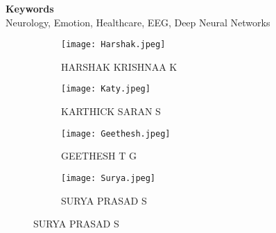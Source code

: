 \documentclass[12 points, a4paper]{article} %
\def\keywords#1{\begin{center}{\bf Keywords}\\{#1}\end{center}} %
\begin{document}
\vspace{5mm} %

\keywords{Neurology, Emotion, Healthcare, EEG, Deep Neural Networks} %

\vspace{15mm} %


\begin{figure}[htbp]
\centering
  \begin{subfigure}[b]{0.24\linewidth}
    \texttt{[image: Harshak.jpeg]}
     \captionsetup{labelformat=empty}
     \caption{HARSHAK KRISHNAA K}
  \end{subfigure}
  \begin{subfigure}[b]{0.22\linewidth}
    \texttt{[image: Katy.jpeg]}
    \captionsetup{labelformat=empty}
    \caption{KARTHICK SARAN S}
  \end{subfigure}
  \begin{subfigure}[b]{0.22\linewidth}
    \texttt{[image: Geethesh.jpeg]}
    \captionsetup{labelformat=empty}
    \caption{GEETHESH T G}
  \end{subfigure}
  \begin{subfigure}[b]{0.22\linewidth}
    \texttt{[image: Surya.jpeg]}
     \captionsetup{labelformat=empty}
     \caption{SURYA PRASAD S}
  \end{subfigure}
\end{figure}
 

\end{document}
